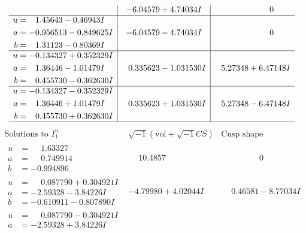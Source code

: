 \documentclass[1p]{elsarticle_modified}
\theoremstyle{definition}
\newcommand{\I}{\sqrt{-1}}
\begin{document}
$$\begin{array}{c|c|c}
 & -6.04579 + 4.74034 I & \phantom{-0.000000 } 0 \\ \hline\begin{aligned}
u &= \phantom{-}1.45643 - 0.46943 I \\
a &= -0.956513 - 0.849625 I \\
b &= \phantom{-}1.31123 - 0.80369 I\end{aligned}
 & -6.04579 - 4.74034 I & \phantom{-0.000000 } 0 \\ \hline\begin{aligned}
u &= -0.134327 + 0.352329 I \\
a &= \phantom{-}1.36446 - 1.01479 I \\
b &= \phantom{-}0.455730 - 0.362630 I\end{aligned}
 & \phantom{-}0.335623 - 1.031530 I & \phantom{-}5.27348 + 6.47148 I \\ \hline\begin{aligned}
u &= -0.134327 - 0.352329 I \\
a &= \phantom{-}1.36446 + 1.01479 I \\
b &= \phantom{-}0.455730 + 0.362630 I\end{aligned}
 & \phantom{-}0.335623 + 1.031530 I & \phantom{-}5.27348 - 6.47148 I\\
 \hline 
 \end{array}$$\newpage$$\begin{array}{c|c|c}  
\text{Solutions to }I^u_{1}& \I (\text{vol} + \sqrt{-1}CS) & \text{Cusp shape}\\
 \hline 
\begin{aligned}
u &= \phantom{-}1.63327\phantom{ +0.000000I} \\
a &= \phantom{-}0.749914\phantom{ +0.000000I} \\
b &= -0.994896\phantom{ +0.000000I}\end{aligned}
 & \phantom{-}10.4857\phantom{ +0.000000I} & \phantom{-0.000000 } 0 \\ \hline\begin{aligned}
u &= \phantom{-}0.087790 + 0.304921 I \\
a &= -2.59328 - 3.84226 I \\
b &= -0.610911 - 0.807890 I\end{aligned}
 & -4.79980 + 4.02044 I & \phantom{-}0.46581 - 8.77034 I \\ \hline\begin{aligned}
u &= \phantom{-}0.087790 - 0.304921 I \\
a &= -2.59328 + 3.84226 I \\

\end{aligned}
\end{array}$$
\end{document}
